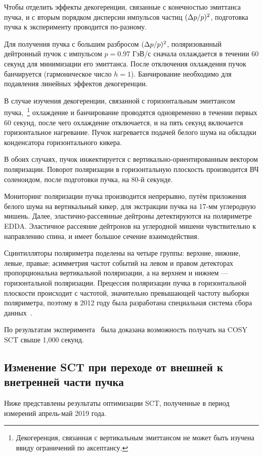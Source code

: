 Чтобы отделить эффекты декогеренции, связанные с конечностью эмиттанса пучка, и с вторым порядком дисперсии импульсов частиц $(\Delta p/p)^2$, подготовка пучка к эксперименту проводится по-разному.

Для получения пучка с большим разбросом $(\Delta p/p)^2$, поляризованный дейтронный пучок с импульсом $p=0.97$ ГэВ/с сначала охлаждается в течении 60 секунд для минимизации его эмиттанса. После отключения охлаждения пучок банчируется (гармоническое число $h=1$). Банчирование необходимо для подавления линейных эффектов декогеренции.

В случае изучения декогеренции, связанной с горизонтальным эмиттансом пучка,~\footnote{Декогеренция, связанная с вертикальным эмиттансом не может быть изучена ввиду ограничений по аксептансу.} охлаждение и банчирование проводятся одновременно в течении первых 60 секунд, после чего охлаждение отключается, и на пять секунд включается горизонтальное нагревание. Пучок нагревается подачей белого шума на обкладки конденсатора горизонтального кикера.

В обоих случаях, пучок инжектируется с вертикально-ориентированным вектором поляризации. Поворот поляризации в горизонтальную плоскость производится ВЧ соленоидом, после подготовки пучка, на 80-й секунде.

Мониторинг поляризации пучка производится непрерывно, путём приложения белого шума на вертикальный кикер, для экстракции пучка на 17-мм углеродную мишень. Далее, эластично-рассеянные дейтроны детектируются на поляриметре EDDA. Эластичное рассеяние дейтронов на углеродной мишени чувствительно к направлению спина, и имеет большое сечение взаимодействия. 

Сцинтилляторы поляриметра поделены на четыре группы: верхние, нижние, левые, правые; асимметрия частот событий на левом и правом детекторах пропорциональна вертикальной поляризации, а на верхнем и нижнем --- горизонтальной поляризации. Прецессия поляризации пучка в горизонтальной плоскости происходит с частотой, значительно превышающей частоту выборки поляриметра, поэтому в 2012 году была разработана специальная система сбора данных~\cite{COSY:SCT:DAQ}.

По результатам эксперимента~\cite{Guidoboni:STORI14} была доказана возможность получать на COSY SCT свыше 1,000 секунд. 

\subsection{Изменение SCT при переходе от внешней к внетренней части пучка}
Ниже представлены результаты оптимизации SCT, полученные в период измерений апрель-май 2019 года. 

